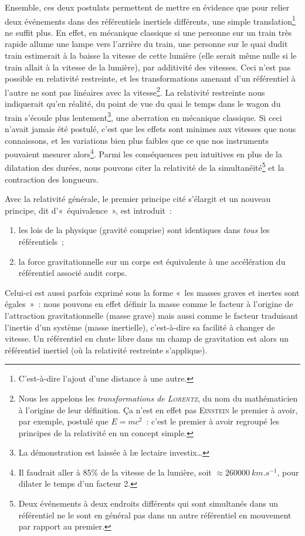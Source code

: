 \documentclass[../main/main.tex]{subfiles}
\begin{document}
Ensemble, ces deux postulats permettent de mettre en évidence que pour relier
deux événements dans des référentiels inertiels différents, une simple
translation\footnote{C'est-à-dire l'ajout d'une distance à une autre.} ne suffit
plus. En effet, en mécanique classique si une personne sur un train très rapide
allume une lampe vers l'arrière du train, une personne sur le quai dudit train
estimerait à la baisse la vitesse de cette lumière (elle serait même nulle si le
train allait à la vitesse de la lumière), par additivité des vitesses. Ceci
n'est pas possible en relativité restreinte, et les transformations amenant d'un
référentiel à l'autre ne sont pas linéaires avec la vitesse\footnote{Nous les
    appelons les \textit{transformations de \textsc{Lorentz}}, du nom du
    mathématicien à l'origine de leur définition. Ça n'est en effet pas
    \textsc{Einstein} le premier à avoir, par exemple, postulé que $E = mc^2$~:
    c'est le premier à avoir regroupé les principes de la relativité en un
concept simple.}. La relativité restreinte nous indiquerait qu'en réalité, du
point de vue du quai le temps dans le wagon du train s'écoule plus
lentement\footnote{La démonstration est laissée à læ lectaire investix…},
une aberration en mécanique classique. Si ceci n'avait jamais été postulé,
c'est que les effets sont minimes aux vitesses que nous connaissons, et les
variations bien plus faibles que ce que nos instruments pouvaient mesurer
alors\footnote{Il faudrait aller à 85\% de la vitesse de la lumière, soit
    $\approx \SI{260000}{km.s^{-1}}$, pour
dilater le temps d'un facteur 2.}. Parmi les conséquences peu intuitives en
plus de la dilatation des durées, nous pouvons citer la relativité de la
simultanéité\footnote{Deux événements à deux endroits différents qui sont
    simultanés dans un référentiel ne le sont en général pas dans un autre
référentiel en mouvement par rapport au premier.} et la contraction des
longueurs.

Avec la relativité générale, le premier principe cité s'élargit et un nouveau
principe, dit d'«~équivalence~», est introduit~:
\begin{enumerate}
    \item les lois de la physique (gravité comprise) sont identiques dans
        \textit{tous} les référentiels~;
    \item la force gravitationnelle sur un corps est équivalente à une
        accélération du référentiel associé audit corps.
\end{enumerate}
Celui-ci est aussi parfois exprimé sous la forme «~les masses graves et inertes
sont égales~»~: nous pouvons en effet définir la masse comme le facteur à
l'origine de l'attraction gravitationnelle (masse grave) mais aussi comme le
facteur traduisant l'inertie d'un système (masse inertielle), c'est-à-dire sa
facilité à changer de vitesse. Un référentiel en chute libre dans un champ de
gravitation est alors un référentiel inertiel (où la relativité restreinte
s'applique).
\end{document}
